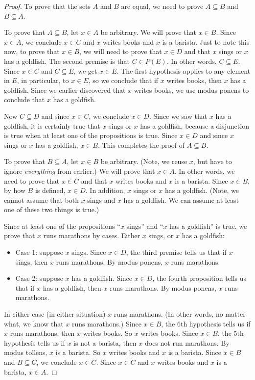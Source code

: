 \documentclass{book}
\theoremstyle{ekimcustom}
\begin{document}
\begin{proof}
To prove that the sets $A$ and $B$ are equal, we need to prove $A \subseteq B$ and $B \subseteq A$.

To prove that $A \subseteq B$, let $x \in A$ be arbitrary. We will prove that $x \in B$. Since $x \in A$, we conclude $x \in C$ and $x$ writes books and $x$ is a barista. Just to note this now, to prove that $x \in B$, we will need to prove that $x \in D$ and that $x$ sings or $x$ has a goldfish.  The second premise is that $C \in P(E)$. In other words, $C \subseteq E$. Since $x \in C$ and $C \subseteq E$, we get $x \in E$. The first hypothesis applies to any element in $E$, in particular, to $x \in E$, so we conclude that if $x$ writes books, then $x$ has a goldfish. Since we earlier discovered that $x$ writes books, we use modus ponens to conclude that $x$ has a goldfish.

Now $C \subseteq D$ and since $x \in C$, we conclude $x \in D$. Since we saw that $x$ has a goldfish, it is certainly true that $x$ sings or $x$ has a goldfish, because a disjunction is true when at least one of the propositions is true. Since $x \in D$ and since $x$ sings or $x$ has a goldfish, $x \in B$. This completes the proof of $A \subseteq B$.

To prove that $B \subseteq A$, let $x \in B$ be arbitrary. (Note, we reuse $x$, but have to ignore \emph{everything} from earlier.) We will prove that $x \in A$. In other words, we need to prove that $x \in C$ and that $x$ writes books and $x$ is a barista. Since $x \in B$, by how $B$ is defined, $x \in D$. In addition, $x$ sings or $x$ has a goldfish. (Note, we cannot assume that both $x$ sings and $x$ has a goldfish. We can assume at least one of these two things is true.)

Since at least one of  the propositions ``$x$ sings'' and ``$x$ has a goldfish'' is true, we prove that $x$ runs marathons by cases. Either $x$ sings, or $x$ has a goldfish:
\begin{itemize}
\item Case 1: suppose $x$ sings. Since $x \in D$, the third premise tells us that if $x$ sings, then $x$ runs marathons. By modus ponens, $x$ runs marathons.
\item Case 2: suppose $x$ has a goldfish. Since $x \in D$, the fourth proposition tells us that if $x$ has a goldfish, then $x$ runs marathons. By modus ponens, $x$ runs marathons.
\end{itemize}
In either case (in either situation) $x$ runs marathons. (In other words, no matter what, we know that $x$ runs marathons.) Since $x \in B$, the 6th hypothesis tells us if $x$ runs marathons, then $x$ writes books. So $x$ writes books. Since $x \in B$, the 5th hypothesis tells us if $x$ is not a barista, then $x$ does not run marathons. By modus tollens, $x$ is a barista. So $x$ writes books and $x$ is a barista. Since $x \in B$ and $B \subseteq C$, we conclude $x \in C$. Since $x \in C$ and $x$ writes books and $x$ is a barista, $x \in A$.
\end{proof}
\end{document}
